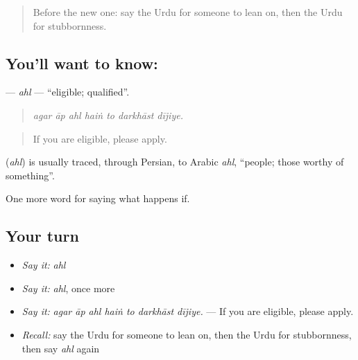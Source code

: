 \label{lesson:UR-C374-ahl}



\begin{quote}
Before the new one: say the Urdu for someone to lean on, then the Urdu for stubbornness.
\end{quote}

\subsection*{You'll want to know: }
\textbf{} — \emph{ahl} — \textquotedblleft{}eligible; qualified\textquotedblright{}.

\begin{quote}
      
\end{quote}

\begin{quote}
\emph{agar āp ahl haiṅ to darkhāst dījiye.}
\end{quote}

\begin{quote}
If you are eligible, please apply.
\end{quote}

\begin{cousinweb}
\textbf{} (\emph{ahl}) is usually traced, through Persian, to Arabic \emph{ahl}, \textquotedblleft{}people; those worthy of something\textquotedblright{}.
\end{cousinweb}

\begin{grammarlens}[title={What you've built}]
One more word for saying what happens if.
\end{grammarlens}

\subsection*{Your turn}
\begin{itemize}
\raggedright
  \item \emph{Say it:} \emph{ahl}
  \item \emph{Say it:} \emph{ahl}, once more
  \item \emph{Say it:} \emph{agar āp ahl haiṅ to darkhāst dījiye.} — If you are eligible, please apply.
  \item \emph{Recall:} say the Urdu for someone to lean on, then the Urdu for stubbornness, then say \emph{ahl} again
\end{itemize}

